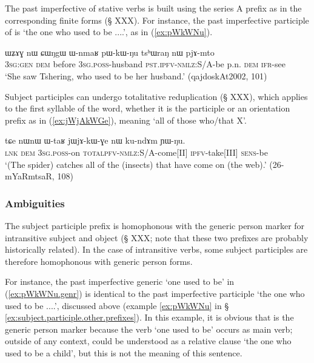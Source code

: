 The past imperfective of stative verbs is built using the series A prefix  as in the corresponding finite forms (§ XXX). For instance, the past imperfective participle of  is  `the one who used to be ....', as in (\ref{ex:pWkWNu}).

\begin{exe}
\ex \label{ex:pWkWNu}
 \gll  ɯʑɤɣ nɯ ɕɯŋgɯ ɯ-nmaʁ pɯ-kɯ-ŋu tsʰɯraŋ nɯ pjɤ-mto \\
 \textsc{3sg}:\textsc{gen} \textsc{dem} before \textsc{3sg}.\textsc{poss}-husband \textsc{pst}.\textsc{ipfv}-\textsc{nmlz}:S/A-be p.n. \textsc{dem} \textsc{ifr}-see \\
\glt `She saw Tshering, who used to be her husband.' (qajdoskAt2002, 101)
\end{exe}

Subject participles can undergo totalitative reduplication (§ XXX), which applies to the first syllable of the word, whether it is the participle  or an orientation prefix as in (\ref{ex:jWjAkWGe}), meaning `all of those who/that X'.

\begin{exe}
\ex \label{ex:jWjAkWGe}
\gll tɕe nɯnɯ ɯ-taʁ jɯ\redp{}jɤ-kɯ-ɣe nɯ ku-ndɤm ɲɯ-ŋu. \\
\textsc{lnk} \textsc{dem} \textsc{3sg}.\textsc{poss}-on \textsc{total}\redp{}\textsc{pfv}-\textsc{nmlz}:S/A-come[II] \textsc{ipfv}-take[III] \textsc{sens}-be \\
\glt `(The spider) catches all of the (insects) that have come on (the web).' (26-mYaRmtsaR, 108)
\end{exe}

\subsubsection{Ambiguities}  \label{ex:subject.participle.ambiguities}
The subject participle  prefix is homophonous with the generic person marker for intransitive subject and object (§ XXX; note that these two prefixes are probably historically related). In the case of intransitive verbs, some subject participles are therefore homophonous with generic person forms. 

For instance, the past imperfective generic  `one used to be' in (\ref{ex:pWkWNu.genr}) is identical to the past imperfective participle  `the one who used to be ....', discussed above (example \ref{ex:pWkWNu} in § \ref{ex:subject.participle.other.prefixes}). In this example, it is obvious that  is the generic person marker because the verb  `one used to be' occurs as main verb; outside of any context,   could be understood as a relative clause `the one who used to be a child', but this is not the meaning of this sentence. 

